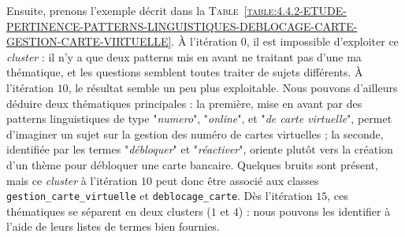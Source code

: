 			Ensuite, prenons l'exemple décrit dans la \textsc{Table~\ref{table:4.4.2-ETUDE-PERTINENCE-PATTERNS-LINGUISTIQUES-DEBLOCAGE-CARTE-GESTION-CARTE-VIRTUELLE}}.
			À l'itération $0$, il est impossible d'exploiter ce \textit{cluster} : il n'y a que deux patterns mis en avant ne traitant pas d'une ma thématique, et les questions semblent toutes traiter de sujets différents.
			À l'itération $10$, le résultat semble un peu plus exploitable.
			Nous pouvons d'ailleurs déduire deux thématiques principales : la première, mise en avant par des patterns linguistiques de type "\textit{numero}", "\textit{online}", et "\textit{de carte virtuelle}", permet d'imaginer un sujet sur la gestion des numéro de cartes virtuelles ; la seconde, identifiée par les termes "\textit{débloquer}" et "\textit{réactiver}", oriente plutôt vers la création d'un thème pour débloquer une carte bancaire.
			Quelques bruits sont présent, mais ce \textit{cluster} à l'itération $10$ peut donc être associé aux classes \texttt{gestion\_carte\_virtuelle} et \texttt{deblocage\_carte}.
			Dès l'itération $15$, ces thématiques se séparent en deux clusters ($1$ et $4$) : nous pouvons les identifier à l'aide de leurs listes de termes bien fournies.
